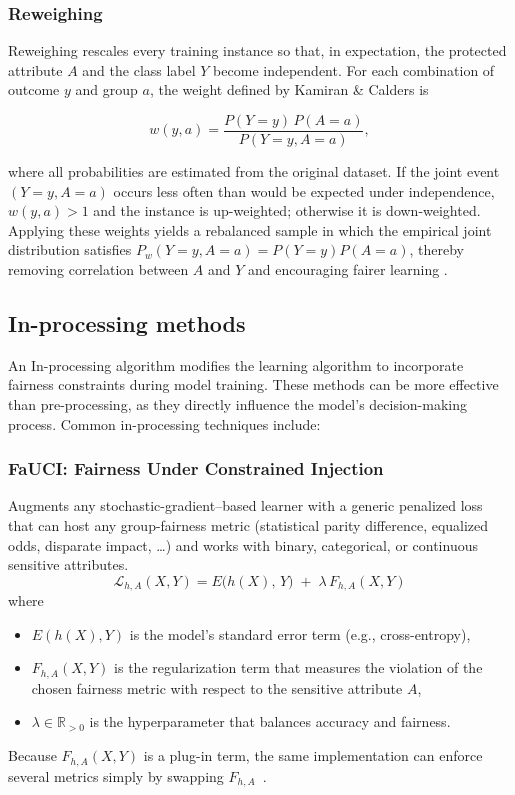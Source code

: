 \documentclass[12pt,a4paper,openright,twoside]{book}
\begin{document}
\subsubsection{Reweighing}
Reweighing rescales every training instance so that, in expectation, the protected attribute $A$ and the class label $Y$ become independent.  
For each combination of outcome $y$ and group $a$, the weight defined by Kamiran \& Calders is  

\begin{equation}
    w(y,a)=\frac{P(Y=y)\,P(A=a)}{P(Y=y,A=a)},
\end{equation}

where all probabilities are estimated from the original dataset.  
If the joint event $(Y{=}y,A{=}a)$ occurs less often than would be expected under independence, $w(y,a)\!>\!1$ and the instance is up-weighted; otherwise it is down-weighted.  
Applying these weights yields a rebalanced sample in which the empirical joint distribution satisfies $P_w(Y=y,A=a)=P(Y=y)P(A=a)$, thereby removing correlation between $A$ and $Y$ and encouraging fairer learning \cite{8907b030dc7644cabfab035645f9b9da}.

\subsection{In-processing methods} 
An In-processing algorithm modifies the learning algorithm to incorporate fairness constraints during model training. These methods can be more effective than pre-processing, as they directly influence the model's decision-making process. Common in-processing techniques include:
\subsubsection{FaUCI: Fairness Under Constrained Injection} Augments any stochastic-gradient–based learner with a generic penalized loss that can host any group-fairness metric (statistical parity difference, equalized odds, disparate impact, …) and works with binary, categorical, or continuous sensitive attributes.
\begin{equation}
\mathcal{L}_{h,A}(X,Y) = E\!\bigl(h(X),\, Y\bigr) \;+\; \lambda\, F_{h,A}(X,Y)
\end{equation}
where
\begin{itemize}
    \item \(E(h(X),Y)\) is the model’s standard error term (e.g., cross-entropy),
    \item \(F_{h,A}(X,Y)\) is the regularization term that measures the violation of the chosen fairness metric with respect to the sensitive attribute \(A\),
    \item \(\lambda \in \mathbb{R}_{>0}\) is the hyperparameter that balances accuracy and fairness.
\end{itemize}
Because $F_{h,A}(X,Y)$ is a plug-in term, the same implementation can enforce several metrics simply by swapping $F_{h,A}$~\cite{fauci-aequitas2024}.
\end{document}
